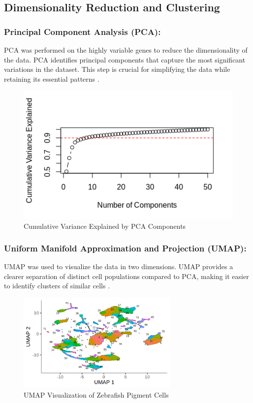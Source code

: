 \documentclass[runningheads]{llncs}
\begin{document}
\subsection*{Dimensionality Reduction and Clustering}
\subsubsection{Principal Component Analysis (PCA):} PCA was performed on the highly variable genes to reduce the dimensionality of the data. PCA identifies principal components that capture the most significant variations in the dataset. This step is crucial for simplifying the data while retaining its essential patterns \cite{nayak2021hitchhiker}.

\begin{figure}[htbp]
\centering
\includegraphics[width=\textwidth]{000012.png}
\caption{Cumulative Variance Explained by PCA Components}
\label{fig_variance}
\end{figure}

\subsubsection{Uniform Manifold Approximation and Projection (UMAP):} UMAP was used to visualize the data in two dimensions. UMAP provides a clearer separation of distinct cell populations compared to PCA, making it easier to identify clusters of similar cells \cite{qiu2017reversed}.

\begin{figure}[htbp]
\centering
\includegraphics[height=0.3\textheight,width=0.7\textwidth]{umap.png}
\caption{UMAP Visualization of Zebrafish Pigment Cells}
\label{fig_umap_dimensions}
\end{figure}
\end{document}
